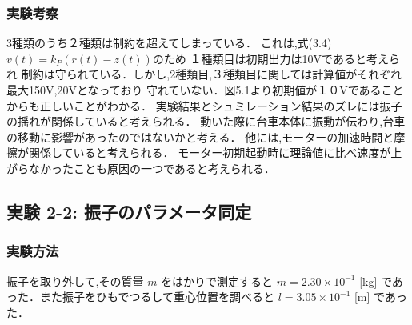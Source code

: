 \newpage

\subsubsection{実験考察}
3種類のうち２種類は制約を超えてしまっている．
これは,式(3.4)\(v(t) = k_P \left( r(t) - z(t) \right)\)のため
１種類目は初期出力は10Vであると考えられ
制約は守られている．しかし,2種類目,３種類目に関しては計算値がそれぞれ最大150V,20Vとなっており
守れていない．図5.1より初期値が１０Vであることからも正しいことがわかる．
実験結果とシュミレーション結果のズレには振子の揺れが関係していると考えられる．
動いた際に台車本体に振動が伝わり,台車の移動に影響があったのではないかと考える．
他には,モーターの加速時間と摩擦が関係していると考えられる．
モーター初期起動時に理論値に比べ速度が上がらなかったことも原因の一つであると考えられる．



\subsection{実験 2-2: 振子のパラメータ同定}
\subsubsection{実験方法}

振子を取り外して,その質量 \( m \) をはかりで測定すると \( m = 2.30 \times 10^{-1} \) [kg] であった．また振子をひもでつるして重心位置を調べると \( l = 3.05 \times 10^{-1} \) [m] であった．

